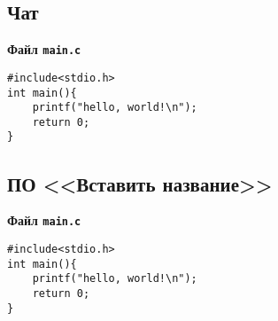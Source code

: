 \documentclass[a4paper,14pt]{extarticle}
\newcommand{\SOFTWARE}{Вставить название}
\begin{document}
\subsection{Чат}\label{code:chat}
\centerline{\textbf{Файл \texttt{main.c}}}
\begin{verbatim}
#include<stdio.h>
int main(){	
	printf("hello, world!\n");
	return 0;
}
\end{verbatim}
\hrulefill

\subsection{ПО <<\SOFTWARE>>}\label{code:soft}
\centerline{\textbf{Файл \texttt{main.c}}}
\begin{verbatim}
#include<stdio.h>
int main(){	
	printf("hello, world!\n");
	return 0;
}
\end{verbatim}
\hrulefill
\end{document}
